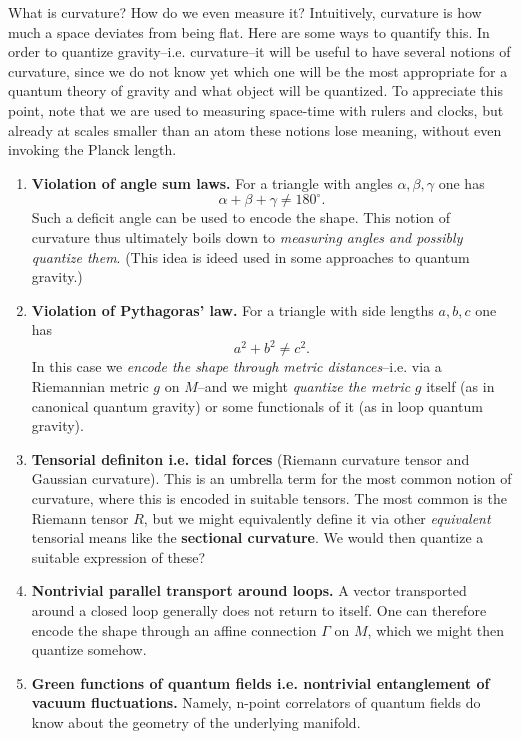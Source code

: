 \documentclass[../geometry_main.tex]{subfiles}
\begin{document}
\begin{mytheorem}
%
What is curvature? How do we even measure it? Intuitively, curvature is how much a space deviates from being flat.
Here are some ways to quantify this.
In order to quantize gravity--i.e. curvature--it will be useful to have several notions of curvature, since we do not know yet which one will be the most appropriate for a quantum theory of gravity and what object will be quantized.
To appreciate this point, note that we are used to measuring space-time with rulers and clocks, but already at scales smaller than an atom these notions lose meaning, without even invoking the Planck length. 


\begin{enumerate}
\item \textbf{Violation of angle sum laws.}  For a triangle with angles \(\alpha,\beta,\gamma\) one has
\[
\alpha + \beta + \gamma \neq 180^\circ.
\]
Such a deficit angle can be used to encode the shape. This notion of curvature thus ultimately boils down to \emph{measuring angles and possibly quantize them}. (This idea is ideed used in some approaches to quantum gravity.)
%
\item \textbf{Violation of Pythagoras' law.}  For a triangle with side lengths \(a,b,c\) one has
\[
a^2 + b^2 \neq c^2.
\]
In this case we \emph{encode the shape through metric distances}--i.e. via a Riemannian metric \(g\) on \(M\)--and we might \emph{quantize the metric} $g$ itself (as in canonical quantum gravity) or some functionals of it (as in loop quantum gravity).
%
\item \textbf{Tensorial definiton i.e. tidal forces} (Riemann curvature tensor and Gaussian curvature).
 This is an umbrella term for the most common notion of curvature, where this is encoded in suitable tensors.
The most common is the Riemann tensor $R$, but we might equivalently define it via other \emph{equivalent} tensorial means like the \textbf{sectional curvature}.
We would then quantize a suitable expression of these?
%
\item \textbf{Nontrivial parallel transport around loops.}  A vector transported around a closed loop generally does not return to itself.  One can therefore encode the shape through an affine connection \(\Gamma\) on \(M\), which we might then quantize somehow.
%
\item \textbf{Green functions of quantum fields i.e. nontrivial entanglement of vacuum fluctuations.} Namely, n-point correlators of quantum fields do know about the geometry of the underlying manifold.

\end{enumerate}
\end{mytheorem}
\end{document}
